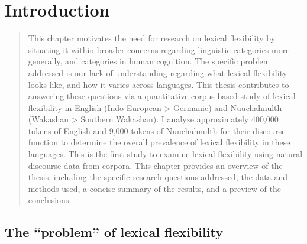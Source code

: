 \chapter{Introduction}
\label{ch:introduction}

\blockquote{This chapter motivates the need for research on lexical flexibility by situating it within broader concerns regarding linguistic categories more generally, and categories in human cognition. The specific problem addressed is our lack of understanding regarding what lexical flexibility looks like, and how it varies across languages. This thesis contributes to answering these questions via a quantitative corpus-based study of lexical flexibility in English (Indo-European > Germanic) and Nuuchahnulth (Wakashan > Southern Wakashan). I analyze approximately 400,000 tokens of English and 9,000 tokens of Nuuchahnulth for their discourse function to determine the overall prevalence of lexical flexibility in these languages. This is the first study to examine lexical flexibility using natural discourse data from corpora. This chapter provides an overview of the thesis, including the specific research questions addressed, the data and methods used, a concise summary of the results, and a preview of the conclusions.}

\section{The \enquote{problem} of lexical flexibility}
\label{sec:1.1}


